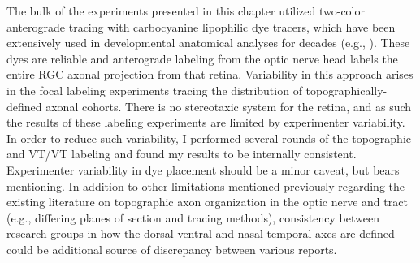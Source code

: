 The bulk of the experiments presented in this chapter utilized two-color anterograde tracing with carbocyanine lipophilic dye tracers, which have been extensively used in developmental anatomical analyses for decades (e.g., ).
These dyes are reliable and anterograde labeling from the optic nerve head labels the entire RGC axonal projection from that retina.
Variability in this approach arises in the focal labeling experiments tracing the distribution of topographically-defined axonal cohorts.
There is no stereotaxic system for the retina, and as such the results of these labeling experiments are limited by experimenter variability.
In order to reduce such variability, I performed several rounds of the topographic and VT/VT labeling and found my results to be internally consistent.
Experimenter variability in dye placement should be a minor caveat, but bears mentioning.
In addition to other limitations mentioned previously regarding the existing literature on topographic axon organization in the optic nerve and tract (e.g., differing planes of section and tracing methods), consistency between research groups in how the dorsal-ventral and nasal-temporal axes are defined could be additional source of discrepancy between various reports.
